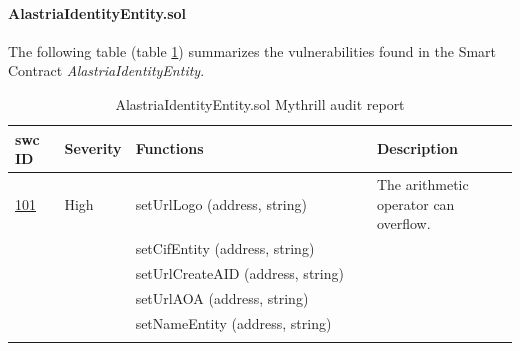 \newpage

\paragraph{AlastriaIdentityEntity.sol}
The following table (table \ref{tab:AlastriaIdentityEntity}) summarizes the vulnerabilities found in the Smart Contract \textit{AlastriaIdentityEntity}.
\begin{longtable}{||p{0.1\linewidth} | p{0.11\linewidth} | p{0.5\linewidth} | p{0.3\linewidth}||}
    \hline
    \textbf{\acrshort{swc} ID}                      & \textbf{Severity} & \textbf{Functions}                & \textbf{Description}                  \\ [0.5ex]
    \hline\hline
    \href{https://swcregistry.io/docs/SWC-101}{101} & High              & setUrlLogo (address, string)      & The arithmetic operator can overflow. \\
    \cline{3-3}
                                                    &                   & setCifEntity (address, string)    &                                       \\
    \cline{3-3}
                                                    &                   & setUrlCreateAID (address, string) &                                       \\
    \cline{3-3}
                                                    &                   & setUrlAOA (address, string)       &                                       \\
    \cline{3-3}
                                                    &                   & setNameEntity (address, string)   &                                       \\[1ex]
    \hline
    \caption{AlastriaIdentityEntity.sol Mythrill audit report}
    \label{tab:AlastriaIdentityEntity}
\end{longtable}

